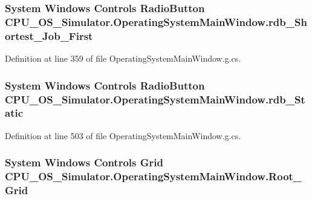 \subsubsection[{rdb\+\_\+\+Shortest\+\_\+\+Job\+\_\+\+First}]{\setlength{\rightskip}{0pt plus 5cm}System Windows Controls Radio\+Button C\+P\+U\+\_\+\+O\+S\+\_\+\+Simulator.\+Operating\+System\+Main\+Window.\+rdb\+\_\+\+Shortest\+\_\+\+Job\+\_\+\+First\hspace{0.3cm}{\ttfamily [package]}}\label{class_c_p_u___o_s___simulator_1_1_operating_system_main_window_ae5bfde3cdd33e7fb8c973fc33ca58752}


Definition at line 359 of file Operating\+System\+Main\+Window.\+g.\+cs.

\hypertarget{class_c_p_u___o_s___simulator_1_1_operating_system_main_window_abb757a3b9a2d8f8c72f54ef2209446b6}{}
\subsubsection[{rdb\+\_\+\+Static}]{\setlength{\rightskip}{0pt plus 5cm}System Windows Controls Radio\+Button C\+P\+U\+\_\+\+O\+S\+\_\+\+Simulator.\+Operating\+System\+Main\+Window.\+rdb\+\_\+\+Static\hspace{0.3cm}{\ttfamily [package]}}\label{class_c_p_u___o_s___simulator_1_1_operating_system_main_window_abb757a3b9a2d8f8c72f54ef2209446b6}


Definition at line 503 of file Operating\+System\+Main\+Window.\+g.\+cs.

\hypertarget{class_c_p_u___o_s___simulator_1_1_operating_system_main_window_aaa4cd76a5ec5398ec2feacccbe5208b4}{}
\subsubsection[{Root\+\_\+\+Grid}]{\setlength{\rightskip}{0pt plus 5cm}System Windows Controls Grid C\+P\+U\+\_\+\+O\+S\+\_\+\+Simulator.\+Operating\+System\+Main\+Window.\+Root\+\_\+\+Grid\hspace{0.3cm}{\ttfamily [package]}}\label{class_c_p_u___o_s___simulator_1_1_operating_system_main_window_aaa4cd76a5ec5398ec2feacccbe5208b4}


